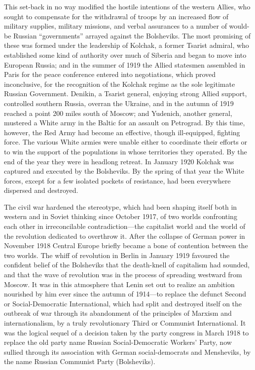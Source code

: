This set-back in no way modified the hostile intentions of the western Allies, who sought to compensate for the withdrawal of troops by an increased flow of military supplies, military missions, and verbal assurances to a number of would-be Russian ``governments'' arrayed against the Bolsheviks. The most promising of these was formed under the leadership of Kolchak, a former Tsarist admiral, who established some kind of authority over much of Siberia and began to move into European Russia; and in the summer of 1919 the Allied statesmen assembled in Paris for the peace conference entered into negotiations, which proved inconclusive, for the recognition of the Kolchak regime as the sole legitimate Russian Government. Denikin, a Tsarist general, enjoying strong Allied support, controlled southern Russia, overran the Ukraine, and in the autumn of 1919 reached a point 200 miles south of Moscow; and Yudenich, another general, mustered a White army in the Baltic for an assault on Petrograd. By this time, however, the Red Army had become an effective, though ill-equipped, fighting force. The various White armies were unable either to coordinate their efforts or to win the support of the populations in whose territories they operated. By the end of the year they were in headlong retreat. In January 1920 Kolchak was captured and executed by the Bolsheviks. By the spring of that year the White forces, except for a few isolated pockets of resistance, had been everywhere dispersed and destroyed. 

The civil war hardened the stereotype, which had been shaping itself both in western and in Soviet thinking since October 1917, of two worlds confronting each other in irreconcilable contradiction---the capitalist world and the world of the revolution dedicated to overthrow it. After the collapse of German power in November 1918 Central Europe briefly became a bone of contention between the two worlds. The whiff of revolution in Berlin in January 1919 favoured the confident belief of the Bolsheviks that the death-knell of capitalism had sounded, and that the wave of revolution was in the process of spreading westward from Moscow. It was in this atmosphere that Lenin set out to realize an ambition nourished by him ever since the autumn of 1914---to replace the defunct Second or Social-Democratic International, which had split and destroyed itself on the outbreak of war through its abandonment of the principles of Marxism and internationalism, by a truly revolutionary Third or Communist International. It was the logical sequel of a decision taken by the party congress in March 1918 to replace the old party name Russian Social-Democratic Workers' Party, now sullied through its association with German social-democrats and Mensheviks, by the name Russian Communist Party (Bolsheviks). 

